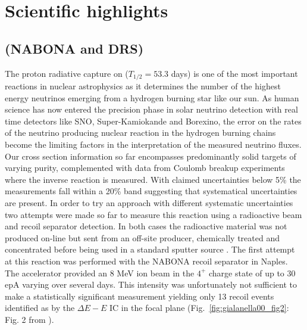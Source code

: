 \section{Scientific highlights}

\subsection{ (NABONA and DRS) }
The proton radiative capture on  ($T_{1/2} = 53.3$ days) is one of the most important reactions in nuclear astrophysics as it determines the number of the highest energy neutrinos emerging from a hydrogen burning star like our sun. As human science has now entered the precision phase in solar neutrino detection with real time detectors like SNO, Super-Kamiokande and Borexino, the error on the rates of the neutrino producing nuclear reaction in the hydrogen burning chains become the limiting factors in the interpretation of the measured neutrino fluxes. Our cross section information so far encompasses predominantly solid  targets of varying purity, complemented with data from Coulomb breakup experiments where the inverse reaction is measured. With claimed uncertainties below 5\% the measurements fall within a 20\% band suggesting that systematical uncertainties are present. In order to try an approach with different systematic uncertainties two attempts were made so far to measure this reaction using a radioactive beam and recoil separator detection. In both cases the radioactive material was not produced on-line but sent from an off-site producer, chemically treated and concentrated before being used in a standard sputter source \cite{gial00}. The first attempt at this reaction was performed with the NABONA recoil separator in Naples. The accelerator provided an 8 MeV  ion beam in the $4^+$ charge state of up to 30 epA varying over several days. This intensity was unfortunately not sufficient to make a statistically significant measurement yielding only 13 recoil events identified as  by the $\Delta{}E-E$ IC in the focal plane (Fig.\ \ref{fig:gialanella00_fig2}: Fig. 2 from \cite{gial00}).

